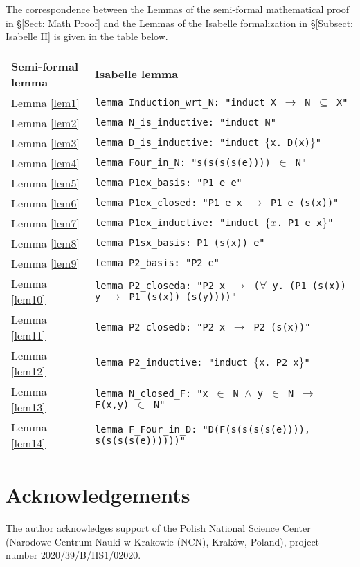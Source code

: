 \documentclass[11pt,a4paper]{article}
\newcommand{\bt}[2]{\small \begin{center}\begin{tabular}{p{#1 cm}p{#2 cm}}}
\def\et{\end{tabular}\end{center}\normalsize}
\theoremstyle{definition}
\begin{document}
The correspondence between the Lemmas of the semi-formal mathematical proof in \S \ref{Sect: Math Proof} and the Lemmas of the Isabelle formalization in \S \ref{Subsect: Isabelle II} is given in the table below.

\bt{3}{13.5}
Semi-formal lemma & Isabelle lemma\\
\hline
Lemma \ref{lem1} & \texttt{lemma Induction\_wrt\_N: "induct X $\longrightarrow$ N $\subseteq$ X"} \\
Lemma \ref{lem2} & \texttt{lemma N\_is\_inductive: "induct N"}\\
Lemma \ref{lem3} & \texttt{lemma D\_is\_inductive: "induct $\{$x. D(x)$\}$"} \\
Lemma \ref{lem4} & \texttt{lemma Four\_in\_N: "s(s(s(s(e)))) $\in$ N"} \\
Lemma \ref{lem5} & \texttt{lemma P1ex\_basis: "P1 e e"} \\
Lemma \ref{lem6} & \texttt{lemma P1ex\_closed: "P1 e x $\longrightarrow$ P1 e (s(x))"}\\
Lemma \ref{lem7} & \texttt{lemma P1ex\_inductive: "induct $\{x$. P1 e x$\}$"} \\
Lemma \ref{lem8} & \texttt{lemma P1sx\_basis: P1 (s(x)) e"} \\
Lemma \ref{lem9} & \texttt{lemma P2\_basis: "P2 e"} \\
Lemma \ref{lem10} & \texttt{lemma P2\_closeda: "P2 x $\longrightarrow$ ($\forall$ y. (P1 (s(x)) y $\longrightarrow$ P1 (s(x)) (s(y))))"} \\
Lemma \ref{lem11} & \texttt{lemma P2\_closedb: "P2 x $\longrightarrow$ P2 (s(x))"} \\ 
Lemma \ref{lem12} & \texttt{lemma P2\_inductive: "induct $\{$x. P2 x$\}$"} \\ 
Lemma \ref{lem13} & \texttt{lemma N\_closed\_F: "x $\in$ N $\wedge$ y $\in$ N $\longrightarrow$ F(x,y) $\in$ N"} \\
Lemma \ref{lem14} & \texttt{lemma F\_Four\_in\_D: "D(F(s(s(s(s(e)))), s(s(s(s(e))))))"} 
\et




\section{Acknowledgements}
The author acknowledges support of the Polish National Science Center (Narodowe Centrum Nauki w Krakowie (NCN), Krak\'{o}w, Poland), project number 2020/39/B/HS1/02020.



\end{document}
